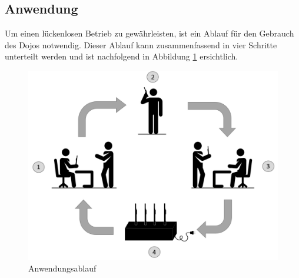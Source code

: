 \subsection{Anwendung}\label{sec:ladeablauf}

Um einen lückenlosen Betrieb zu gewährleisten, ist ein Ablauf für den Gebrauch des Dojos notwendig. Dieser Ablauf kann zusammenfassend in vier Schritte unterteilt werden und ist nachfolgend in Abbildung \ref{fig:Anwendungsablauf Dojo} ersichtlich.

\begin{figure}[H]
	\begin{center}
		\includegraphics[width=140mm]{data/Ladezyklus.png}
		\caption[Anwendungsablauf des Dojos]{Anwendungsablauf} %
		\label{fig:Anwendungsablauf Dojo}
	\end{center}
\end{figure}

